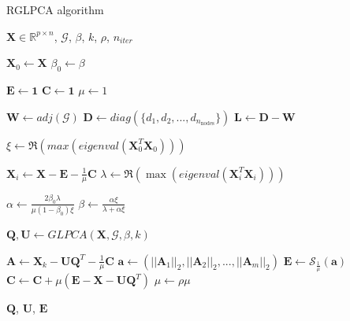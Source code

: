 \documentclass[sigconf]{acmart}
\begin{document}
  
  \begin{algorithm}[H]
  \caption{RGLPCA algorithm}\label{alg:rglpca}
  \begin{algorithmic}
      \Require $\mathbf{X} \in \mathbb{R}^{p \times n}$, $\mathcal{G}$, $\beta$, $k$, $\rho$, $n_{iter}$
      
      \State $\mathbf{X}_0 \gets \mathbf{X}$
      \State $\beta_0 \gets \beta$
      
      \State $\mathbf{E} \gets \bm{1}$
      \State $\mathbf{C} \gets \bm{1}$
      \State $\mu \gets 1$
      
      \State $\mathbf{W} \gets adj(\mathcal{G})$
      \State $\mathbf{D} \gets diag(\{d_1, d_2, ..., d_{n_{\text{nodes}}}\})$
      \State $\mathbf{L} \gets \mathbf{D} - \mathbf{W}$
      
      \State $\xi \gets \Re(max(eigenval(\mathbf{X}_0^T \mathbf{X}_0)))$
      
          \State $\mathbf{X}_i \gets \mathbf{X} - \mathbf{E} - \frac{1}{\mu}\mathbf{C}$
          \State $\lambda \gets \Re(\max(eigenval(\mathbf{X}_i^T \mathbf{X}_i)))$
      
          \State $\alpha \gets \frac{2 \beta_0 \lambda}{\mu (1 - \beta_0)\xi}$
          \State $\beta \gets \frac{\alpha \xi}{\lambda + \alpha \xi}$
      
          \State $\mathbf{Q}, \mathbf{U} \gets GLPCA(\mathbf{X}, \mathcal{G}, \beta, k)$
      
          \State $\mathbf{A} \gets \mathbf{X}_k - \mathbf{UQ}^T - \frac{1}{\mu} \mathbf{C}$
          \State $\mathbf{a} \gets (||\mathbf{A}_1||_2, ||\mathbf{A}_2||_2, ..., ||\mathbf{A}_m||_2)$
          \State $\mathbf{E} \gets \mathcal{S}_{\frac{1}{\mu}}(\mathbf{a})$
          \State $\mathbf{C} \gets \mathbf{C} + \mu(\mathbf{E} - \mathbf{X} - \mathbf{UQ}^T)$
          \State $\mu \gets \rho \mu$
          
      \EndFor
      
      \State \Return $\mathbf{Q}$, $\mathbf{U}$, $\mathbf{E}$
  \end{algorithmic}
  \end{algorithm}
  
\end{document}
